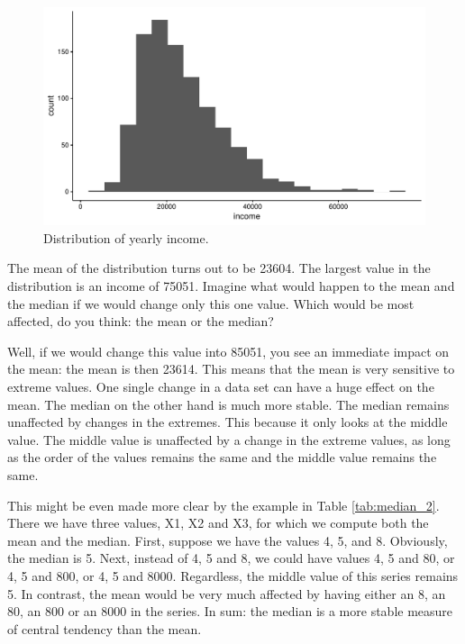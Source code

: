 \documentclass[]{book}\usepackage[]{graphicx}\usepackage[]{color}
\makeatletter
\def\maxwidth{ %
  \ifdim\Gin@nat@width>\linewidth
    \linewidth
  \else
    \Gin@nat@width
  \fi
}
\makeatother
\begin{document}
\begin{figure}

{\centering \includegraphics[width=\maxwidth]{figure/median-1} 

}

\caption[Distribution of yearly income]{Distribution of yearly income.}\label{fig:median}
\end{figure}



The mean of the distribution turns out to be 23604. The largest value in the distribution is an income of 75051. Imagine what would happen to the mean and the median if we would change only this one value. Which would be most affected, do you think: the mean or the median?



Well, if we would change this value into 85051, you see an immediate impact on the mean: the mean is then 23614. This means that the mean is very sensitive to extreme values. One single change in a data set can have a huge effect on the mean. The median on the other hand is much more stable. The median remains unaffected by changes in the extremes. This because it only looks at the middle value. The middle value is unaffected by a change in the extreme values, as long as the order of the values remains the same and the middle value remains the same.

This might be even made more clear by the example in Table \ref{tab:median_2}. There we have three values, X1, X2 and X3, for which we compute both the mean and the median. First, suppose we have the values 4, 5, and 8. Obviously, the median is 5. Next, instead of 4, 5 and 8, we could have values 4, 5 and 80, or 4, 5 and 800, or 4, 5 and 8000. Regardless, the middle value of this series remains 5. In contrast, the mean would be very much affected by having either an 8, an 80, an 800 or an 8000 in the series. In sum: the median is a more stable measure of central tendency than the mean.
\end{document}
